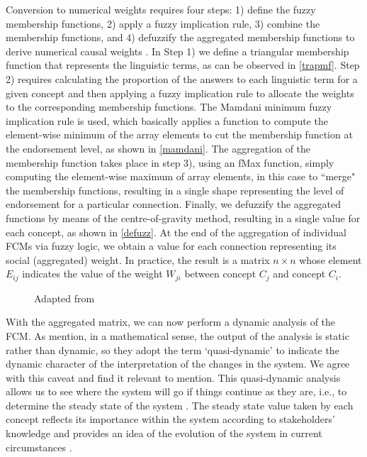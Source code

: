 Conversion to numerical weights requires four steps: 1) define the fuzzy membership functions, 2) apply a fuzzy implication rule, 3) combine the membership functions, and 4) defuzzify the aggregated membership functions to derive numerical causal weights \citep{mkhitaryan2022fcmpy}. In Step 1) we define a triangular membership function that represents the linguistic terms, as can be observed in \cref{trapmf}. Step 2) requires calculating the proportion of the answers to each linguistic term for a given concept and then applying a fuzzy implication rule to allocate the weights to the corresponding membership functions. The Mamdani minimum fuzzy implication rule is used, which basically applies a function to compute the element-wise minimum of the array elements to cut the membership function at the endorsement level, as shown in \cref{mamdani}. The aggregation of the membership function takes place in step 3), using an fMax function, simply computing the element-wise maximum of array elements, in this case to ``merge" the membership functions, resulting in a single shape representing the level of endorsement for a particular connection. Finally, we defuzzify the aggregated functions by means of the centre-of-gravity method, resulting in a single value for each concept, as shown in \cref{defuzz}. At the end of the aggregation of individual FCMs via fuzzy logic, we obtain a value for each connection representing its social (aggregated) weight. In practice, the result is a matrix $n \times n$ whose element $ E_{ij} $ indicates the value of the weight $ W_{ji} $ between concept $ C_{j} $ and concept $ C_{i} $. 



\begin{figure}\centering
{}\hfill
{}\par 
{}
\caption*{Adapted from \cite{mkhitaryan2022fcmpy}}
\label{FCMpy}
\end{figure}


With the aggregated matrix, we can now perform a dynamic analysis of the FCM. As \cite{edwards2021building} mention, in a mathematical sense, the output of the analysis is static rather than dynamic, so they adopt the term ‘quasi-dynamic’ to indicate the dynamic character of the interpretation of the changes in the system. We agree with this caveat and find it relevant to mention. This quasi-dynamic analysis allows us to see where the system will go if things continue as they are, i.e., to determine the steady state of the system \citep{ozesmi2004ecological}. The steady state value taken by each concept reflects its importance within the system according to stakeholders' knowledge and provides an idea of the evolution of the system in current circumstances \citep{lopolito2020combined}. 

